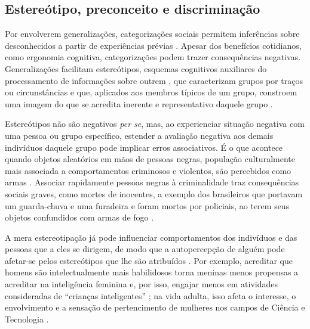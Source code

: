 \documentclass[portuguese]{textolivre}
\begin{document}
\subsection{Estereótipo, preconceito e discriminação}

Por envolverem generalizações, categorizações sociais permitem inferências sobre desconhecidos a partir de experiências prévias \cite{rhodes2019development}. Apesar dos benefícios cotidianos, como ergonomia cognitiva, categorizações podem trazer consequências negativas. Generalizações facilitam estereótipos, esquemas cognitivos auxiliares do processamento de informações sobre outrem \cite{hilton1996stereotypes}, que caracterizam grupos por traços ou circunstâncias \cite{amodio2014neuroscience} e que, aplicados aos membros típicos de um grupo, constroem uma imagem do que se acredita inerente e representativo daquele grupo \cite{dovidio2010}.

Estereótipos não são negativos \textit{per se}, mas, ao experienciar situação negativa com uma pessoa ou grupo específico, estender a avaliação negativa aos demais indivíduos daquele grupo pode implicar erros associativos. É o que acontece quando objetos aleatórios em mãos de pessoas negras, população culturalmente mais associada a comportamentos criminosos e violentos, são percebidos como armas \cite{payne2001prejudice}. Associar rapidamente pessoas negras à criminalidade traz consequências sociais graves, como mortes de inocentes, a exemplo dos brasileiros que portavam um guarda-chuva e uma furadeira e foram mortos por policiais, ao terem seus objetos confundidos com armas de fogo \cite{merola2010, moura2018}. 

A mera estereotipação já pode influenciar comportamentos dos indivíduos e das pessoas que a eles se dirigem, de modo que a autopercepção de alguém pode afetar-se pelos estereótipos que lhe são atribuídos \cite{rhodes2019development}. Por exemplo, acreditar que homens são intelectualmente mais habilidosos torna meninas menos propensas a acreditar na inteligência feminina e, por isso, engajar menos em atividades consideradas de “crianças inteligentes” \cite{bian2017gender}; na vida adulta, isso afeta o interesse, o envolvimento e a sensação de pertencimento de mulheres nos campos de Ciência e Tecnologia \cite{cheryan2009ambient, nosek2009national}. 
\end{document}
